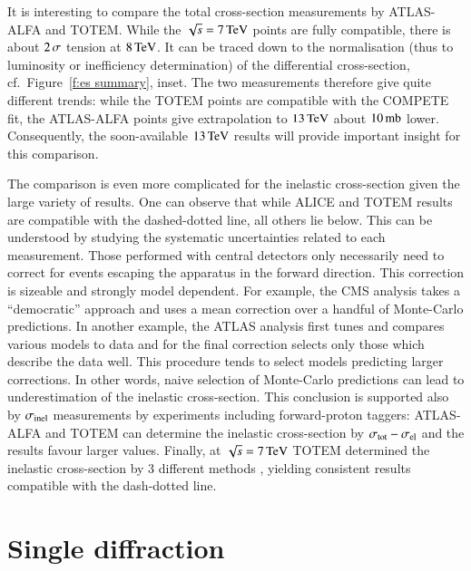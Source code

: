 \documentclass{webofc}
\def\un#1{\,{\rm #1}}
\begin{document}
It is interesting to compare the total cross-section measurements by ATLAS-ALFA and TOTEM. While the $\sqrt s = 7\un{TeV}$ points are fully compatible, there is about $2\un{\sigma}$ tension at $8\un{TeV}$. It can be traced down to the normalisation (thus to luminosity or inefficiency determination) of the differential cross-section, cf.~Figure~\ref{f:es summary}, inset. The two measurements therefore give quite different trends: while the TOTEM points are compatible with the COMPETE fit, the ATLAS-ALFA points give extrapolation to $13\un{TeV}$ about $10\un{mb}$ lower. Consequently, the soon-available $13\un{TeV}$ results will provide important insight for this comparison.

The comparison is even more complicated for the inelastic cross-section given the large variety of results. One can observe that while ALICE and TOTEM results are compatible with the dashed-dotted line, all others lie below. This can be understood by studying the systematic uncertainties related to each measurement. Those performed with central detectors only necessarily need to correct for events escaping the apparatus in the forward direction. This correction is sizeable and strongly model dependent. For example, the CMS analysis \cite{cms-inel-13tev} takes a ``democratic'' approach and uses a mean correction over a handful of Monte-Carlo predictions. In another example, the ATLAS analysis \cite{atlas-inel-13tev} first tunes and compares various models to data and for the final correction selects only those which describe the data well. This procedure tends to select models predicting larger corrections. In other words, naive selection of Monte-Carlo predictions can lead to underestimation of the inelastic cross-section. This conclusion is supported also by $\sigma_{\rm inel}$ measurements by experiments including forward-proton taggers: ATLAS-ALFA and TOTEM can determine the inelastic cross-section by $\sigma_{\rm tot} - \sigma_{\rm el}$ and the results favour larger values. Finally, at $\sqrt s = 7\un{TeV}$ TOTEM determined the inelastic cross-section by 3 different methods \cite{totem-si-tot-7tev}, yielding consistent results compatible with the dash-dotted line.


\section{Single diffraction}
\label{s:sd}
\end{document}
